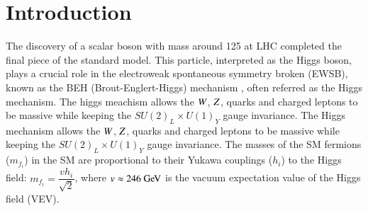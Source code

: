 \section{Introduction}\label{sec:introduction}
The discovery of a scalar boson with mass around 125 \GeV at LHC \cite{Higgs_ATLAS, Higgs_CMS} completed the final piece of the standard model.
This particle, interpreted as the Higgs boson, plays a crucial role in the electroweak spontaneous symmetry broken (EWSB), 
known as the BEH (Brout-Englert-Higgs) mechanism \cite{BEH,BEH2,BEH3}, often referred as the Higgs mechanism.
The higgs meachism allows the $W$, $Z$, 
quarks and charged leptons to be massive while keeping the $SU(2)_L \times U(1)_Y$ gauge invariance.
The Higgs mechanism allows the $W$, $Z$, quarks and charged leptons to be massive while keeping the $SU(2)_L \times U(1)_Y$ gauge invariance. The masses of the SM fermions ($m_{f_i}$) in the SM are proportional to their Yukawa couplings ($h_i$) to the Higgs field: $m_{f_i} = \dfrac{vh_i}{\sqrt{2}}$, where $v\approx 246\GeV$ is the vacuum expectation value of the Higgs field (VEV).

